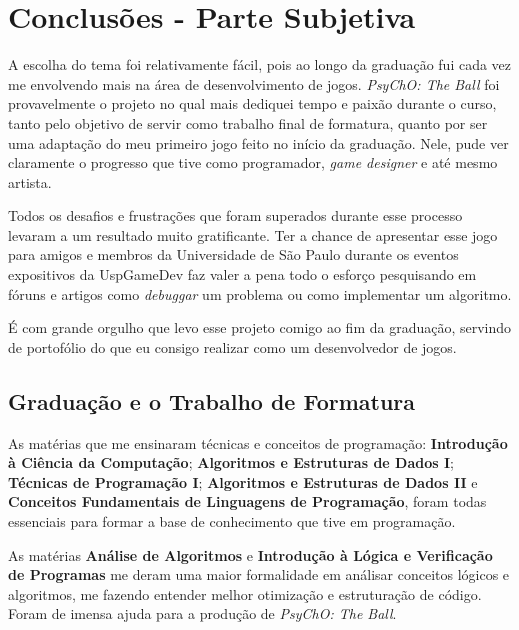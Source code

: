 \chapter{Conclusões - Parte Subjetiva}
\label{cap:conclusoes}

A escolha do tema foi relativamente fácil, pois ao longo da graduação fui cada vez me envolvendo mais na área de desenvolvimento de jogos. \textit{PsyChO: The Ball} foi provavelmente o projeto no qual mais dediquei tempo e paixão durante o curso, tanto pelo objetivo de servir como trabalho final de formatura, quanto por ser uma adaptação do meu primeiro jogo feito no início da graduação. Nele, pude ver claramente o progresso que tive como programador, \textit{game designer} e até mesmo artista.

Todos os desafios e frustrações que foram superados durante esse processo levaram a um resultado muito gratificante. Ter a chance de apresentar esse jogo para amigos e membros da Universidade de São Paulo durante os eventos expositivos da UspGameDev faz valer a pena todo o esforço pesquisando em fóruns e artigos como \textit{debuggar} um problema ou como implementar um algoritmo.

É com grande orgulho que levo esse projeto comigo ao fim da graduação, servindo de portofólio do que eu consigo realizar como um desenvolvedor de jogos.

\section{Graduação e o Trabalho de Formatura}
\label{sec:materias_utilizadas}

As matérias que me ensinaram técnicas e conceitos de programação: \textbf{Introdução à Ciência da Computação}; \textbf{Algoritmos e Estruturas de Dados I}; \textbf{Técnicas de Programação I}; \textbf{Algoritmos e Estruturas de Dados II} e \textbf{Conceitos Fundamentais de Linguagens de Programação}, foram todas essenciais para formar a base de conhecimento que tive em programação.

As matérias \textbf{Análise de Algoritmos} e \textbf{Introdução à Lógica e Verificação de Programas} me deram uma maior formalidade em análisar conceitos lógicos e algoritmos, me fazendo entender melhor otimização e estruturação de código. Foram de imensa ajuda para a produção de \textit{PsyChO: The Ball}.

